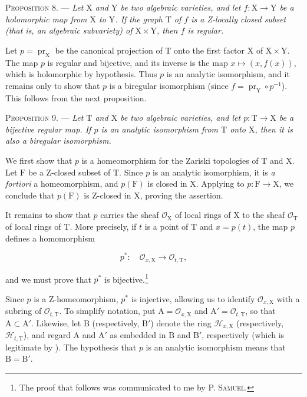 \textsc{Proposition 8}. --- \emph{Let $\mathrm{X}$ and $\mathrm{Y}$ be two algebraic varieties, and let $f:\mathrm{X}\to \mathrm{Y}$ be a holomorphic map from $\mathrm{X}$ to $\mathrm{Y}$. If the graph $\mathrm{T}$ of $f$ is a Z-locally closed subset (that is, an algebraic subvariety) of $\mathrm{X}\times \mathrm{Y}$, then $f$ is regular.}

Let $p=\operatorname{pr}_\mathrm{X}$ be the canonical projection of $\mathrm{T}$ onto the first factor $\mathrm{X}$ of $\mathrm{X}\times \mathrm{Y}$. The map $p$ is regular and bijective, and its inverse is the map $x\mapsto(x,f(x))$, which is holomorphic by hypothesis. Thus $p$ is an analytic isomorphism, and it remains only to show that $p$ is a biregular isomorphism (since $f=\operatorname{pr}_\mathrm{Y}\circ p^{-1}$). This follows from the next proposition.

\textsc{Proposition 9}. --- \emph{Let $\mathrm{T}$ and $\mathrm{X}$ be two algebraic varieties, and let $p:\mathrm{T}\to \mathrm{X}$ be a bijective regular map. If $p$ is an analytic isomorphism from $\mathrm{T}$ onto $\mathrm{X}$, then it is also a biregular isomorphism.}

We first show that $p$ is a homeomorphism for the Zariski topologies of $\mathrm{T}$ and $\mathrm{X}$. Let $\mathrm{F}$ be a Z-closed subset of $\mathrm{T}$. Since $p$ is an analytic isomorphism, it is \emph{a fortiori} a homeomorphism, and $p(\mathrm{F})$ is closed in $\mathrm{X}$. Applying  to $p:\mathrm{F}\to \mathrm{X}$, we conclude that $p(\mathrm{F})$ is Z-closed in $\mathrm{X}$, proving the assertion.

It remains to show that $p$ carries the sheaf $\mathcal{O}_\mathrm{X}$ of local rings of $\mathrm{X}$ to the sheaf $\mathcal{O}_\mathrm{T}$ of local rings of $\mathrm{T}$. More precisely, if $t$ is a point of $\mathrm{T}$ and $x=p(t)$, the map $p$ defines a homomorphism

\begin{equation*}
p^*:\quad\mathcal{O}_{x,\mathrm{X}}\longrightarrow\mathcal{O}_{t,\mathrm{T}},
\end{equation*}

and we must prove that $p^*$ is bijective.\footnote{The proof that follows was communicated to me by P. \textsc{Samuel}.}

Since $p$ is a Z-homeomorphism, $p^*$ is injective, allowing us to identify $\mathcal{O}_{x,\mathrm{X}}$ with a subring of $\mathcal{O}_{t,\mathrm{T}}$. To simplify notation, put $\mathrm{A}=\mathcal{O}_{x,\mathrm{X}}$ and $\mathrm{A}'=\mathcal{O}_{t,\mathrm{T}}$, so that $\mathrm{A}\subset \mathrm{A}'$. Likewise, let $\mathrm{B}$ (respectively, $\mathrm{B}'$) denote the ring $\mathcal{H}_{x,\mathrm{X}}$ (respectively, $\mathcal{H}_{t,\mathrm{T}}$), and regard $\mathrm{A}$ and $\mathrm{A}'$ as embedded in $\mathrm{B}$ and $\mathrm{B}'$, respectively (which is legitimate by ). The hypothesis that $p$ is an analytic isomorphism means that $\mathrm{B}=\mathrm{B}'$.

